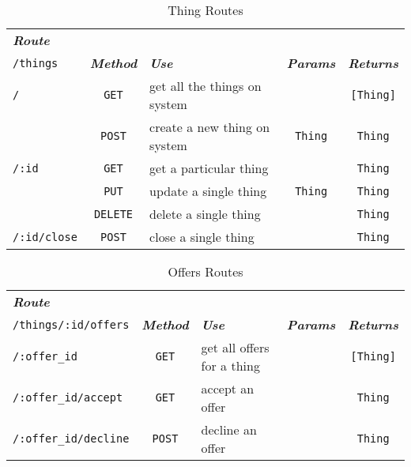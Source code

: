 \begin{table}[!h]
    \centering
    \begin{tabularx}{\textwidth}{lcXcc}
    \toprule
    \centering
    \emph{\textbf{Route}} & & & \\
    \texttt{/things} & \emph{\textbf{Method}} & \emph{\textbf{Use}} & \emph{\textbf{Params}} & \emph{\textbf{Returns}} \\
    \midrule
    \texttt{/}
    		& \texttt{GET} & get all the things on system  & \NA 			& \texttt{[Thing]} \\ \cline{2-5} \noalign{\smallskip}
    		& \texttt{POST} & create a new thing on system & \texttt{Thing} & \texttt{Thing} \\
	\midrule    	
    	\texttt{/:id}
    		& \texttt{GET} & get a particular thing & \NA & \texttt{Thing} \\ \cline{2-5} \noalign{\smallskip}
    		& \texttt{PUT} & update a single thing & \texttt{Thing} & \texttt{Thing} \\ \cline{2-5} \noalign{\smallskip}
    		& \texttt{DELETE} & delete a single thing & \NA & \texttt{Thing} \\
    	\midrule
    	\texttt{/:id/close}
    		& \texttt{POST} & close a single thing & \NA & \texttt{Thing} \\
    \bottomrule
    \hline
    \end{tabularx}
    \caption{Thing Routes}
    \label{table:thing-routes}
\end{table}

\begin{table}[!h]
    \centering
    \begin{tabularx}{\textwidth}{lcXcc}
    \toprule
    \centering
    \emph{\textbf{Route}} & & & \\
    \texttt{/things/:id/offers} & \emph{\textbf{Method}} & \emph{\textbf{Use}} & \emph{\textbf{Params}} & \emph{\textbf{Returns}}\\
    \midrule
    \texttt{/:offer\_id}
    		& \texttt{GET} & get all offers for a thing & \NA & \texttt{[Thing]} \\ \cline{1-5} \noalign{\smallskip}
    	\texttt{/:offer\_id/accept}
    		& \texttt{GET} & accept an offer & \NA & \texttt{Thing} \\ \cline{1-5} \noalign{\smallskip}
    	\texttt{/:offer\_id/decline}
    		& \texttt{POST} & decline an offer & \NA & \texttt{Thing} \\
    \bottomrule
    \hline
    \end{tabularx}
    \caption{Offers Routes}
    \label{table:offers-routes}
\end{table}

